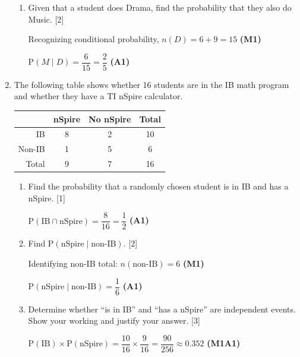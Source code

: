 \documentclass[12pt, twoside]{article}
\begin{document}
\begin{enumerate}[itemsep=0.1cm]
\begin{enumerate}[itemsep=0.3cm]
  \item Given that a student does Drama, find the probability that they also do Music. \hfill [2]

  Recognizing conditional probability, $n(D) = 6 + 9 = 15$ \hfill \textbf{(M1)}

  $\mathrm{P}(M \mid D) = \dfrac{6}{15} = \dfrac{2}{5}$ \hfill \textbf{(A1)}
\end{enumerate}

\newpage

\item The following table shows whether 16 students are in the IB math program
and whether they have a TI nSpire calculator.

\renewcommand{\arraystretch}{1.4}
\begin{center}
\begin{tabular}{|r|c|c|c|}
    \hline
    & nSpire & No nSpire & Total \\
    \hline
    IB        & 8  & 2  & 10 \\
    \hline
    Non-IB    & 1  & 5  & 6 \\
    \hline
    Total     & 9  & 7  & 16 \\
    \hline
\end{tabular}
\end{center}

\begin{enumerate}[itemsep=0.3cm]
  \item Find the probability that a randomly chosen student is in IB
        and has a nSpire. \hfill [1]

  $\mathrm{P}(\text{IB} \cap \text{nSpire}) = \dfrac{8}{16} = \dfrac{1}{2}$ \hfill \textbf{(A1)}

  \item Find $\mathrm{P}(\text{nSpire} \mid \text{non-IB})$. \hfill [2]

  Identifying non-IB total: $n(\text{non-IB}) = 6$ \hfill \textbf{(M1)}

  $\mathrm{P}(\text{nSpire} \mid \text{non-IB}) = \dfrac{1}{6}$ \hfill \textbf{(A1)}

  \item Determine whether ``is in IB'' and ``has a nSpire'' are
        independent events.
        Show your working and justify your answer. \hfill [3]

  $\mathrm{P}(\text{IB}) \times \mathrm{P}(\text{nSpire})
    = \dfrac{10}{16} \times \dfrac{9}{16}
    = \dfrac{90}{256} \approx 0.352$ \hfill \textbf{(M1A1)}


\end{enumerate}
\end{enumerate}
\end{document}
